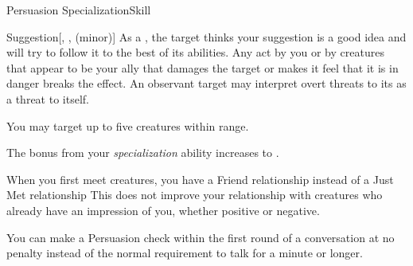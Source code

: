 \begin{feat}{Persuasion Specialization}{Skill}
\begin{freeability}{Suggestion}[, ,  (minor)]
            \hit As a , the target thinks your suggestion is a good idea and will try to follow it to the best of its abilities.
            Any act by you or by creatures that appear to be your ally that damages the target or makes it feel that it is in danger breaks the effect.
            An observant target may interpret overt threats to its  as a threat to itself.

            \rankline
             You may target up to five creatures within range.
        \end{freeability}

         The bonus from your \textit{specialization} ability increases to .

         When you first meet creatures, you have a Friend relationship instead of a Just Met relationship
        This does not improve your relationship with creatures who already have an impression of you, whether positive or negative.

         You can make a Persuasion check within the first round of a conversation at no penalty instead of the normal requirement to talk for a minute or longer.
    \end{feat}

